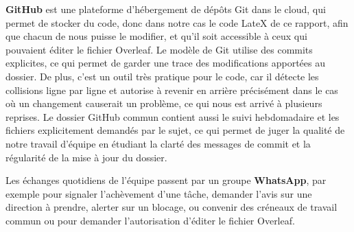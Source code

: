 \documentclass[12pt,a4paper]{article}
\begin{document}
\textbf{GitHub} est une plateforme d'hébergement de dépôts Git dans le cloud, qui permet de stocker du code, donc dans notre cas le code LateX de ce rapport, afin que chacun de nous puisse le modifier, et qu’il soit accessible à ceux qui pouvaient éditer le fichier Overleaf.
Le modèle de Git utilise des commits explicites, ce qui permet de garder une trace des modifications apportées au dossier. De plus, c’est un outil très pratique pour le code, car il détecte les collisions ligne par ligne et autorise à revenir en arrière précisément dans le cas où un changement causerait un problème, ce qui nous est arrivé à plusieurs reprises.
Le dossier GitHub commun contient aussi le suivi hebdomadaire et les fichiers explicitement demandés par le sujet, ce qui permet de juger la qualité de notre travail d'équipe en étudiant la clarté des messages de commit et la régularité de la mise à jour du dossier. 

Les échanges quotidiens de l'équipe passent par un groupe \textbf{WhatsApp}, par exemple pour signaler l'achèvement d'une tâche, demander l'avis sur une direction à prendre, alerter sur un blocage, ou convenir des créneaux de travail commun ou pour demander l'autorisation d'éditer le fichier Overleaf.
\end{document}
